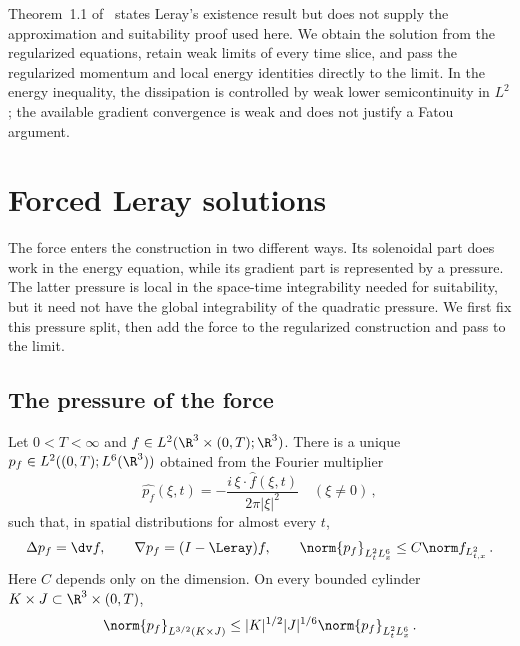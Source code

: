 \documentclass[11pt,reqno]{amsart}
\begin{document}
\begin{remark}
Theorem~1.1 of~\cite[printed p.~212]{ESS2003} states Leray's existence result but does not
supply the approximation and suitability proof used here. We obtain the
solution from the regularized equations, retain weak limits of every time
slice, and pass the regularized momentum and local energy identities directly
to the limit. In the energy inequality, the dissipation is controlled by weak
lower semicontinuity in $L^2$; the available gradient convergence is weak and
does not justify a Fatou argument.
\end{remark}



\section{Forced Leray solutions}\label{sec:forced-leray}

The force enters the construction in two different ways. Its solenoidal part
does work in the energy equation, while its gradient part is represented by a
pressure. The latter pressure is local in the space-time integrability needed
for suitability, but it need not have the global integrability of the
quadratic pressure. We first fix this pressure split, then add the force to
the regularized construction and pass to the limit.

\subsection{The pressure of the force}

\begin{lemma}\label{lem:force-pressure}
Let $0<T<\infty$ and $f\in L^2(\R^3\times(0,T);\R^3)$. There is a unique
$p_f\in L^2((0,T);L^6(\R^3))$ obtained from the Fourier multiplier
\begin{equation}\label{eq:force-pressure-multiplier}
 \widehat{p_f}(\xi,t)=-\frac{i\,\xi\cdot\widehat f(\xi,t)}
                              {2\pi|\xi|^2}\quad(\xi\ne0)\,,
\end{equation}
such that, in spatial distributions for almost every $t$,
\begin{equation}\label{eq:force-pressure-identities}
 \Delta p_f=\dv f,\qquad \nabla p_f=(I-\Leray)f,\qquad
 \norm{p_f}_{L^2_tL^6_x}\le C\norm f_{L^2_{t,x}}\,.
\end{equation}
Here $C$ depends only on the dimension. On every bounded cylinder
$K\times J\subset\R^3\times(0,T)$,
\begin{equation}\label{eq:force-pressure-local}
 \norm{p_f}_{L^{3/2}(K\times J)}
 \le |K|^{1/2}|J|^{1/6}\norm{p_f}_{L^2_tL^6_x}\,.
\end{equation}
\end{lemma}
\end{document}
